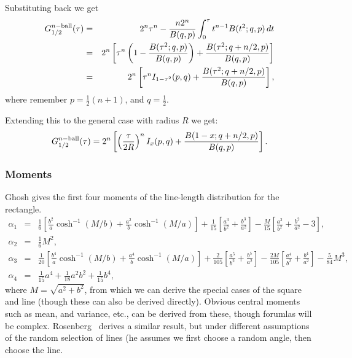 Substituting back we get
\begin{eqnarray}
   G^{n-{\rm ball}}_{1/2}(\tau)
       & = &  2^n \tau^{n} 
            - \frac{n 2^n}{B(q,p)} \int_0^\tau t^{n-1}   B(t^2; q,p) \, dt  \nonumber \\
       & = &  2^n \left[ \tau^{n} \left(1-   \frac{B(\tau^2; q,p)}{B(q,p)} \right)
                           + \frac{B(\tau^2; q+n/2,p)}{B(q,p)} \right] \nonumber \\
       & = &  2^n \left[ \tau^{n} I_{1-\tau^2}(p,q)  + \frac{B(\tau^2; q+n/2,p)}{B(q,p)} \right],
\end{eqnarray}
where remember $p = \frac{1}{2} (n+1)$, and $q=\frac{1}{2}$.

Extending this to the general case with radius $R$ we get:
\begin{equation}
  \label{eq:cdf_n-ball}  
   G^{n-{\rm ball}}_{1/2}(\tau)
     =  2^n \left[ \left( \frac{\tau}{2R} \right)^{n} I_{x}(p,q)  + \frac{B(1-x; q+n/2,p)}{B(q,p)} \right].
\end{equation}


\subsubsection{Moments}

Ghosh \cite{b.ghosh51:_random_rect} gives the first four moments of
the line-length distribution for the rectangle.
\begin{eqnarray}
  \label{eq:rect_moments} 
  \alpha_1 & = & \frac{1}{6} \left[ 
                        \frac{b^2}{a} \cosh^{-1}\left( M/b \right) +
                        \frac{a^2}{b} \cosh^{-1}\left( M/a \right) 
                 \right]
                  + \frac{1}{15} \left[ \frac{a^3}{b^2} + \frac{b^3}{a^2} \right]
                  - \frac{M}{15} \left[ \frac{a^2}{b^2} + \frac{b^2}{a^2} -3 \right],
\\
  \alpha_2 & = & \frac{1}{6} M^2, \\
  \alpha_3 & = & \frac{1}{20} \left[ 
                        \frac{b^4}{a} \cosh^{-1}\left( M/b \right) +
                        \frac{a^4}{b} \cosh^{-1}\left( M/a \right) 
                 \right]
                  + \frac{2}{105} \left[ \frac{a^5}{b^2} + \frac{b^5}{a^2} \right]
                  - \frac{2M}{105} \left[ \frac{a^4}{b^2} + \frac{b^4}{a^2}\right]
                        - \frac{5}{84} M^3, 
\\
  \alpha_4 & = & \frac{1}{15} a^4 + \frac{1}{18} a^2 b^2 + \frac{1}{15} b^4,
\end{eqnarray}
where $M = \sqrt{a^2 + b^2}$, from which we can derive the special
cases of the square and line (though these can also be derived
directly). Obvious central moments such as mean, and variance, etc.,
can be derived from these, though forumlas will be
complex. Rosenberg~\cite{Rosenberg200499} derives a similar result,
but under different assumptions of the random selection of lines (he
assumes we first choose a random angle, then choose the line.

